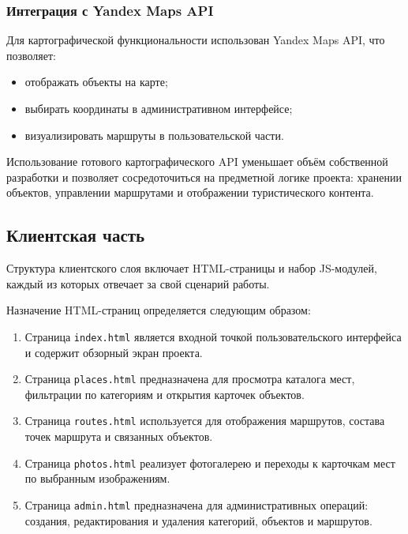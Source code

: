 \subsubsection{Интеграция с Yandex Maps API}
Для картографической функциональности использован Yandex Maps API,
что позволяет:
\begin{itemize}
	\item отображать объекты на карте;
	\item выбирать координаты в административном интерфейсе;
	\item визуализировать маршруты в пользовательской части.
\end{itemize}

Использование готового картографического API уменьшает объём собственной
разработки и позволяет сосредоточиться на предметной логике проекта: хранении
объектов, управлении маршрутами и отображении туристического контента.

\subsection{Клиентская часть}
Структура клиентского слоя включает HTML-страницы и
набор JS-модулей, каждый из которых отвечает за свой сценарий работы.

Назначение HTML-страниц определяется следующим образом:
\begin{enumerate}
	\item Страница \texttt{index.html} является входной точкой пользовательского интерфейса и содержит обзорный экран проекта.
	\item Страница \texttt{places.html} предназначена для просмотра каталога мест, фильтрации по категориям и открытия карточек объектов.
	\item Страница \texttt{routes.html} используется для отображения маршрутов, состава точек маршрута и связанных объектов.
	\item Страница \texttt{photos.html} реализует фотогалерею и переходы к карточкам мест по выбранным изображениям.
	\item Страница \texttt{admin.html} предназначена для административных операций: создания, редактирования и удаления категорий, объектов и маршрутов.
\end{enumerate}

